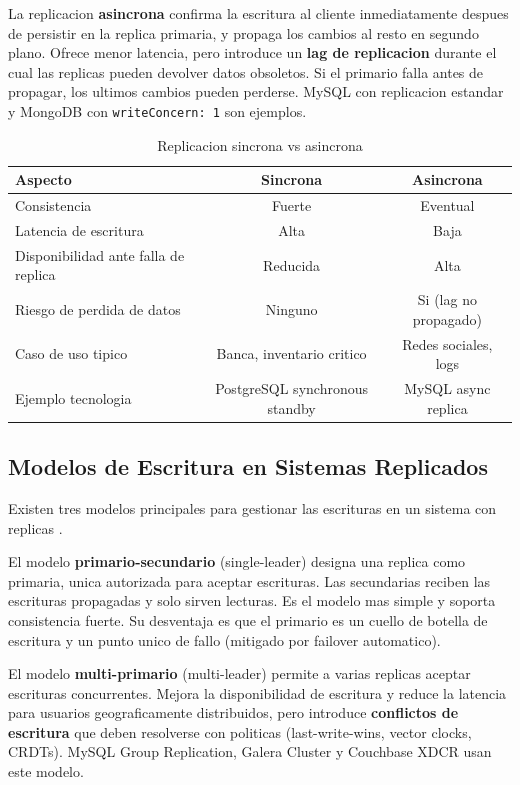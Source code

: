 \documentclass[11pt,a4paper]{article}
\begin{document}
La replicacion \textbf{asincrona} confirma la escritura al cliente inmediatamente despues de persistir en la replica primaria, y propaga los cambios al resto en segundo plano. Ofrece menor latencia, pero introduce un \textbf{lag de replicacion} durante el cual las replicas pueden devolver datos obsoletos. Si el primario falla antes de propagar, los ultimos cambios pueden perderse. MySQL con replicacion estandar y MongoDB con \texttt{writeConcern: 1} son ejemplos.

\begin{table}[H]
\centering
\caption{Replicacion sincrona vs asincrona}
\small
\begin{tabular}{lcc}
\toprule
\textbf{Aspecto} & \textbf{Sincrona} & \textbf{Asincrona} \\
\midrule
Consistencia & Fuerte & Eventual \\
Latencia de escritura & Alta & Baja \\
Disponibilidad ante falla de replica & Reducida & Alta \\
Riesgo de perdida de datos & Ninguno & Si (lag no propagado) \\
Caso de uso tipico & Banca, inventario critico & Redes sociales, logs \\
Ejemplo tecnologia & PostgreSQL synchronous standby & MySQL async replica \\
\bottomrule
\end{tabular}
\label{tab:sincasync}
\end{table}

\subsection{Modelos de Escritura en Sistemas Replicados}

Existen tres modelos principales para gestionar las escrituras en un sistema con replicas \cite{kleppmann2017}.

El modelo \textbf{primario-secundario} (single-leader) designa una replica como primaria, unica autorizada para aceptar escrituras. Las secundarias reciben las escrituras propagadas y solo sirven lecturas. Es el modelo mas simple y soporta consistencia fuerte. Su desventaja es que el primario es un cuello de botella de escritura y un punto unico de fallo (mitigado por failover automatico).

El modelo \textbf{multi-primario} (multi-leader) permite a varias replicas aceptar escrituras concurrentes. Mejora la disponibilidad de escritura y reduce la latencia para usuarios geograficamente distribuidos, pero introduce \textbf{conflictos de escritura} que deben resolverse con politicas (last-write-wins, vector clocks, CRDTs). MySQL Group Replication, Galera Cluster y Couchbase XDCR usan este modelo.
\end{document}
